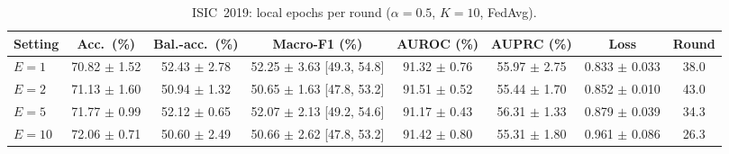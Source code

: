 \begin{table}[!t]
\caption{ISIC~2019: local epochs per round ($\alpha{=}0.5$, $K{=}10$, FedAvg).}
\label{tab:19-localepochs}
\centering
\footnotesize
\begin{tabular}{lccccccc}
\toprule
Setting & Acc.\ (\%) & Bal.-acc.\ (\%) & Macro-F1 (\%) & AUROC (\%) & AUPRC (\%) & Loss & Round \\
\midrule
$E=1$ & 70.82 $\pm$ 1.52 & 52.43 $\pm$ 2.78 & 52.25 $\pm$ 3.63 [49.3, 54.8] & 91.32 $\pm$ 0.76 & 55.97 $\pm$ 2.75 & 0.833 $\pm$ 0.033 & 38.0 \\
$E=2$ & 71.13 $\pm$ 1.60 & 50.94 $\pm$ 1.32 & 50.65 $\pm$ 1.63 [47.8, 53.2] & 91.51 $\pm$ 0.52 & 55.44 $\pm$ 1.70 & 0.852 $\pm$ 0.010 & 43.0 \\
$E=5$ & 71.77 $\pm$ 0.99 & 52.12 $\pm$ 0.65 & 52.07 $\pm$ 2.13 [49.2, 54.6] & 91.17 $\pm$ 0.43 & 56.31 $\pm$ 1.33 & 0.879 $\pm$ 0.039 & 34.3 \\
$E=10$ & 72.06 $\pm$ 0.71 & 50.60 $\pm$ 2.49 & 50.66 $\pm$ 2.62 [47.8, 53.2] & 91.42 $\pm$ 0.80 & 55.31 $\pm$ 1.80 & 0.961 $\pm$ 0.086 & 26.3 \\
\bottomrule
\end{tabular}
\end{table}